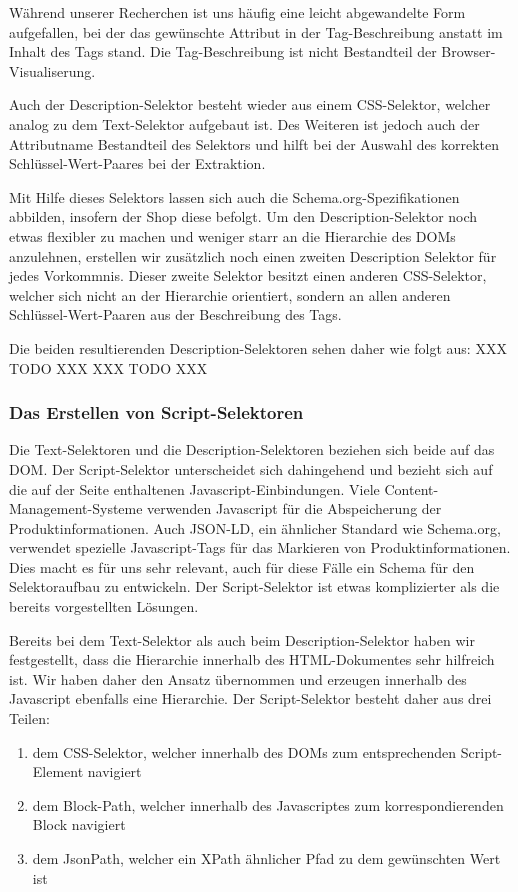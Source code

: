 Während unserer Recherchen ist uns häufig eine leicht abgewandelte Form aufgefallen, bei der das gewünschte Attribut
in der Tag-Beschreibung anstatt im Inhalt des Tags stand.
Die Tag-Beschreibung ist nicht Bestandteil der Browser-Visualiserung.

Auch der Description-Selektor besteht wieder aus einem CSS-Selektor, welcher analog zu dem Text-Selektor aufgebaut ist.
Des Weiteren ist jedoch auch der Attributname Bestandteil des Selektors und hilft bei der Auswahl des korrekten
Schlüssel-Wert-Paares bei der Extraktion.

Mit Hilfe dieses Selektors lassen sich auch die Schema.org-Spezifikationen abbilden, insofern der Shop diese befolgt.
Um den Description-Selektor noch etwas flexibler zu machen und weniger starr an die Hierarchie des DOMs anzulehnen,
erstellen wir zusätzlich noch einen zweiten Description Selektor für jedes Vorkommnis.
Dieser zweite Selektor besitzt einen anderen CSS-Selektor, welcher sich nicht an der Hierarchie orientiert, sondern
an allen anderen Schlüssel-Wert-Paaren aus der Beschreibung des Tags.

Die beiden resultierenden Description-Selektoren sehen daher wie folgt aus:
XXX TODO XXX
XXX TODO XXX

\subsubsection{Das Erstellen von Script-Selektoren}
\label{subsubsec:erstellen-von-script-selektoren}

Die Text-Selektoren und die Description-Selektoren beziehen sich beide auf das DOM.
Der Script-Selektor unterscheidet sich dahingehend und bezieht sich auf die auf der Seite enthaltenen
Javascript-Einbindungen.
Viele Content-Management-Systeme verwenden Javascript für die Abspeicherung der Produktinformationen.
Auch JSON-LD, ein ähnlicher Standard wie Schema.org, verwendet spezielle Javascript-Tags für das Markieren von
Produktinformationen.
Dies macht es für uns sehr relevant, auch für diese Fälle ein Schema für den Selektoraufbau zu entwickeln.
Der Script-Selektor ist etwas komplizierter als die bereits vorgestellten Lösungen.

Bereits bei dem Text-Selektor als auch beim Description-Selektor haben wir festgestellt, dass die Hierarchie
innerhalb des HTML-Dokumentes sehr hilfreich ist.
Wir haben daher den Ansatz übernommen und erzeugen innerhalb des Javascript ebenfalls eine Hierarchie.
Der Script-Selektor besteht daher aus drei Teilen:
\begin{enumerate}
    \item dem CSS-Selektor, welcher innerhalb des DOMs zum entsprechenden Script-Element navigiert
    \item dem Block-Path, welcher innerhalb des Javascriptes zum korrespondierenden Block navigiert
    \item dem JsonPath, welcher ein XPath ähnlicher Pfad zu dem gewünschten Wert ist
\end{enumerate}

